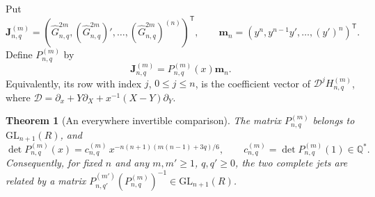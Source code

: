 \documentclass[11pt,a4paper]{article}
\newtheorem{theorem}{Theorem}[section]
\theoremstyle{definition}
\theoremstyle{remark}
\numberwithin{equation}{section}
\begin{document}
Put
\[
 \mathbf J^{(m)}_{n,q}
  =(\widehat G^{2m}_{n,q},(\widehat G^{2m}_{n,q})',\ldots,
                          (\widehat G^{2m}_{n,q})^{(n)})^{\mathsf T},
 \qquad
 \mathbf m_n=(y^n,y^{n-1}y',\ldots,(y')^n)^{\mathsf T}.
\]
Define $P^{(m)}_{n,q}$ by
\begin{equation}\label{evb:P}
 \mathbf J^{(m)}_{n,q}=P^{(m)}_{n,q}(x)\mathbf m_n.
\end{equation}
Equivalently, its row with index $j$, $0\le j\le n$, is the
coefficient vector of $\mathscr D^jH^{(m)}_{n,q}$, where
$\mathscr D=\partial_x+Y\partial_X+x^{-1}(X-Y)\partial_Y$.

\begin{theorem}[An everywhere invertible comparison]\label{evb:gauge}
The matrix $P^{(m)}_{n,q}$ belongs to $\mathrm{GL}_{n+1}(R)$, and
\begin{equation}\label{evb:det}
 \det P^{(m)}_{n,q}(x)
 =c^{(m)}_{n,q}\,x^{-n(n+1)(m(n-1)+3q)/6},
 \qquad c^{(m)}_{n,q}=\det P^{(m)}_{n,q}(1)\in\mathbb Q^*.
\end{equation}
Consequently, for fixed $n$ and any $m,m'\ge1$, $q,q'\ge0$,
the two complete jets are related by a matrix
$P^{(m')}_{n,q'}(P^{(m)}_{n,q})^{-1}\in\mathrm{GL}_{n+1}(R)$.
\end{theorem}
\end{document}
